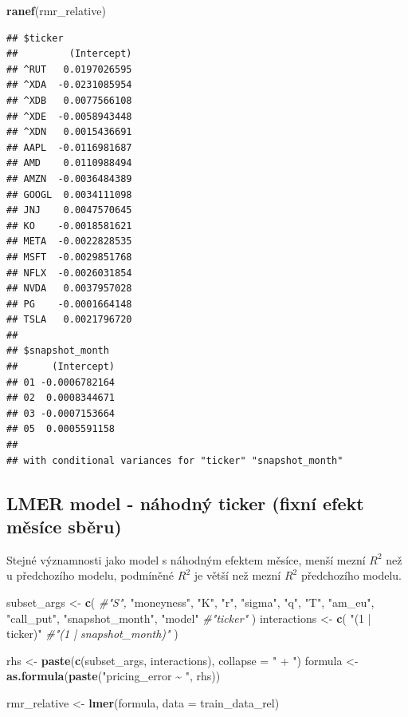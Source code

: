 \documentclass[
]{article}
\newenvironment{Shaded}{\begin{snugshade}}{\end{snugshade}}
\newcommand{\AttributeTok}[1]{\textcolor[rgb]{0.13,0.29,0.53}{#1}}
\newcommand{\CommentTok}[1]{\textcolor[rgb]{0.56,0.35,0.01}{\textit{#1}}}
\newcommand{\FunctionTok}[1]{\textcolor[rgb]{0.13,0.29,0.53}{\textbf{#1}}}
\newcommand{\NormalTok}[1]{#1}
\newcommand{\OtherTok}[1]{\textcolor[rgb]{0.56,0.35,0.01}{#1}}
\newcommand{\StringTok}[1]{\textcolor[rgb]{0.31,0.60,0.02}{#1}}
\begin{document}
\begin{Shaded}
\begin{Highlighting}[]
\FunctionTok{ranef}\NormalTok{(rmr\_relative)}
\end{Highlighting}
\end{Shaded}

\begin{verbatim}
## $ticker
##         (Intercept)
## ^RUT   0.0197026595
## ^XDA  -0.0231085954
## ^XDB   0.0077566108
## ^XDE  -0.0058943448
## ^XDN   0.0015436691
## AAPL  -0.0116981687
## AMD    0.0110988494
## AMZN  -0.0036484389
## GOOGL  0.0034111098
## JNJ    0.0047570645
## KO    -0.0018581621
## META  -0.0022828535
## MSFT  -0.0029851768
## NFLX  -0.0026031854
## NVDA   0.0037957028
## PG    -0.0001664148
## TSLA   0.0021796720
## 
## $snapshot_month
##      (Intercept)
## 01 -0.0006782164
## 02  0.0008344671
## 03 -0.0007153664
## 05  0.0005591158
## 
## with conditional variances for "ticker" "snapshot_month"
\end{verbatim}

\subsection{LMER model - náhodný ticker (fixní efekt měsíce
sběru)}\label{lmer-model---nuxe1hodnuxfd-ticker-fixnuxed-efekt-mux11bsuxedce-sbux11bru}

Stejné významnosti jako model s náhodným efektem měsíce, menší mezní
\(R^2\) než u předchozího modelu, podmíněné \(R^2\) je větší než mezní
\(R^2\) předchozího modelu.

\begin{Shaded}
\begin{Highlighting}[]
\NormalTok{subset\_args }\OtherTok{\textless{}{-}} \FunctionTok{c}\NormalTok{(}
  \CommentTok{\#"S",}
  \StringTok{"moneyness"}\NormalTok{,}
  \StringTok{"K"}\NormalTok{,}
  \StringTok{"r"}\NormalTok{,}
  \StringTok{"sigma"}\NormalTok{,}
  \StringTok{"q"}\NormalTok{,}
  \StringTok{"T"}\NormalTok{,}
  \StringTok{"am\_eu"}\NormalTok{,}
  \StringTok{"call\_put"}\NormalTok{,}
  \StringTok{"snapshot\_month"}\NormalTok{,}
  \StringTok{"model"}
  \CommentTok{\#"ticker"}
\NormalTok{)}
\NormalTok{interactions }\OtherTok{\textless{}{-}} \FunctionTok{c}\NormalTok{(}
  \StringTok{"(1 | ticker)"}
  \CommentTok{\#"(1 | snapshot\_month)"}
\NormalTok{)}

\NormalTok{rhs }\OtherTok{\textless{}{-}} \FunctionTok{paste}\NormalTok{(}\FunctionTok{c}\NormalTok{(subset\_args, interactions), }\AttributeTok{collapse =} \StringTok{" + "}\NormalTok{)}
\NormalTok{formula }\OtherTok{\textless{}{-}} \FunctionTok{as.formula}\NormalTok{(}\FunctionTok{paste}\NormalTok{(}\StringTok{"pricing\_error \textasciitilde{} "}\NormalTok{, rhs))}

\NormalTok{rmr\_relative }\OtherTok{\textless{}{-}} \FunctionTok{lmer}\NormalTok{(formula, }\AttributeTok{data =}\NormalTok{ train\_data\_rel)}
\end{Highlighting}
\end{Shaded}
\end{document}
